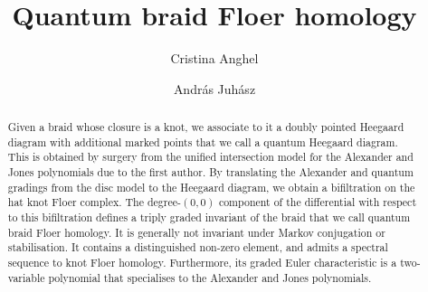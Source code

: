 \documentclass[11pt]{amsart}
\numberwithin{equation}{section}
\numberwithin{figure}{section}
\theoremstyle{definition}
\begin{document}
\title{Quantum braid Floer homology}

\author{Cristina Anghel}
\address{Laboratoire de math\'ematiques Blaise Pascal, Universit\'e Clermont-Auvergne, Campus des C\'ezeaux 3, place Vasarely, 63178 Aubi\`ere, France; Institute of Mathematics “Simion Stoilow” of the Romanian Academy, 21 Calea Griviei Street, 010702 Bucharest, Romania.}

\author{Andr\'{a}s Juh\'{a}sz}
\address{Mathematical Institute, University of Oxford, Andrew Wiles Building,
	Radcliffe Observatory Quarter, Woodstock Road, Oxford, OX2 6GG, UK}

\date{}


\begin{abstract}
    Given a braid whose closure is a knot, we associate to it a doubly pointed Heegaard diagram with additional marked points that we call a quantum Heegaard diagram. This is obtained by surgery from the unified intersection model for the Alexander and Jones polynomials due to the first author. By translating the Alexander and quantum gradings from the disc model to the Heegaard diagram, we obtain a bifiltration on the hat knot Floer complex. The degree-$(0,0)$ component of the differential with respect to this bifiltration defines a triply graded invariant of the braid that we call quantum braid Floer homology. It is generally not invariant under Markov conjugation or stabilisation. It contains a distinguished non-zero element, and admits a spectral sequence to knot Floer homology. Furthermore, its graded Euler characteristic is a two-variable polynomial that specialises to the Alexander and Jones polynomials.
\end{abstract}

\maketitle
\end{document}
